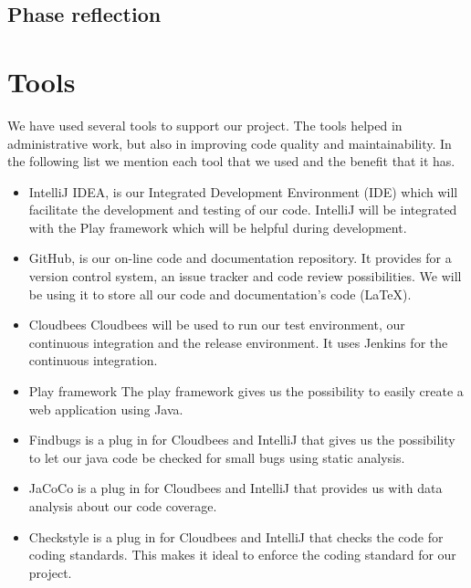 \subsection{Phase reflection}

\section{Tools}
We have used several tools to support our project.
The tools helped in administrative work, but also in improving code quality and maintainability.
In the following list we mention each tool that we used and the benefit that it has.

\begin{itemize}
\item IntelliJ IDEA, is our Integrated Development Environment (IDE) which will facilitate the development and testing of our code.
IntelliJ will be integrated with the Play framework which will be helpful during development.
\item GitHub, is our on-line code and documentation repository.
It provides for a version control system, an issue tracker and code review possibilities.
We will be using it to store all our code and documentation's code (LaTeX).
\item Cloudbees
Cloudbees will be used to run our test environment, our continuous integration and the release environment.
It uses Jenkins for the continuous integration.
\item Play framework
The play framework gives us the possibility to easily create a web application using Java.
\item Findbugs is a plug in for Cloudbees and IntelliJ that gives us the possibility to let our java code be checked for small bugs using static analysis.
\item JaCoCo is a plug in for Cloudbees and IntelliJ that provides us with data analysis about our code coverage.
\item Checkstyle is a plug in for Cloudbees and IntelliJ that checks the code for coding standards.
This makes it ideal to enforce the coding standard for our project.
\end{itemize}
